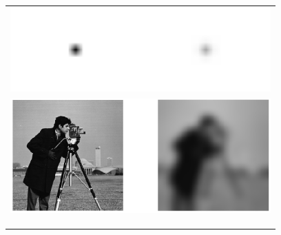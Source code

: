 \documentclass{standalone}
\begin{document}
\begin{tabular}{c}
	\includegraphics[width=10cm]{pix_ges.png}\\
	\includegraphics[width=10cm]{pic.png}\\
	\\
	\\
	\hspace{0.07cm}\\
\end{tabular}
\end{document}
